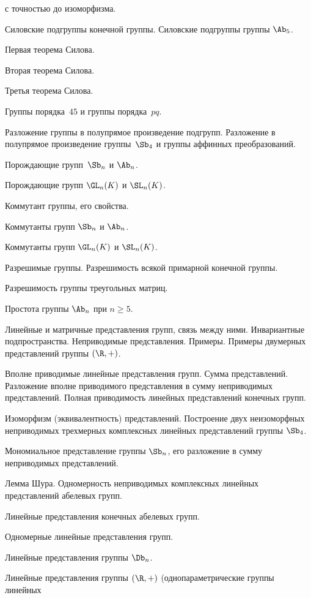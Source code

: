 \documentclass[a4paper]{article}
\begin{document}
\begin{nums}{-1}
      с точностью до изоморфизма.
\item Силовские подгруппы конечной группы. Силовские подгруппы группы $\Ab_5$.
\item Первая теорема Силова.
\item Вторая теорема Силова.
\item Третья теорема Силова.
\item Группы порядка~$45$ и группы порядка~$pq$.
\item Разложение группы в полупрямое произведение подгрупп. Разложение в полупрямое произведение
      группы~$\Sb_4$ и группы аффинных преобразований.
\item Порождающие групп~$\Sb_n$ и $\Ab_n$.
\item Порождающие групп $\GL_n(K)$ и $\SL_n(K)$.
\item Коммутант группы, его свойства.
\item Коммутанты групп $\Sb_n$ и $\Ab_n$.
\item Коммутанты групп $\GL_n(K)$ и $\SL_n(K)$.
\item Разрешимые группы. Разрешимость всякой примарной конечной группы.
\item Разрешимость группы треугольных матриц.
\item Простота группы $\Ab_n$ при $n\ge5$.
\item Линейные и матричные представления групп, связь между ними. Инвариантные подпространства. Неприводимые представления. Примеры.
Примеры двумерных представлений группы $(\R,+)$.
\item Вполне приводимые линейные представления групп. Сумма представлений. Разложение вполне приводимого
представления в сумму неприводимых представлений. Полная приводимость линейных представлений конечных групп.
\item Изоморфизм (эквивалентность) представлений. Построение двух неизоморфных неприводимых трехмерных
комплексных линейных представлений группы $\Sb_4$.
\item Мономиальное представление группы $\Sb_n$, его разложение в сумму неприводимых представлений.
\item Лемма Шура. Одномерность неприводимых комплексных линейных представлений абелевых групп.
\item Линейные представления конечных абелевых групп.
\item Одномерные линейные представления групп.
\item Линейные представления группы $\Db_n$.
\item Линейные представления группы $(\R,+)$ (однопараметрические группы линейных

\end{nums}
\end{document}
